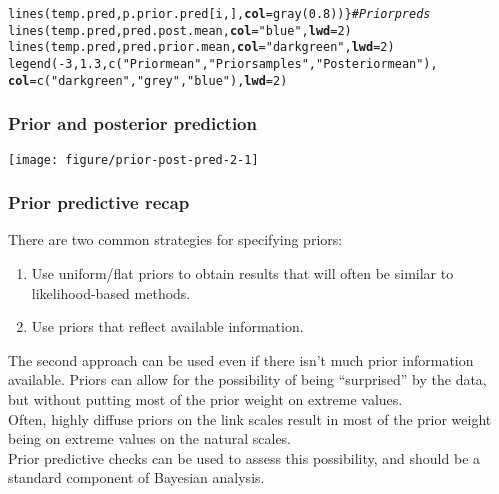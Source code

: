 \documentclass[color=usenames,dvipsnames]{beamer}\usepackage[]{graphicx}\usepackage[]{color}
\makeatletter
\newcommand{\hlnum}[1]{\textcolor[rgb]{0.69,0.494,0}{#1}}%
\newcommand{\hlstr}[1]{\textcolor[rgb]{0.749,0.012,0.012}{#1}}%
\newcommand{\hlcom}[1]{\textcolor[rgb]{0.514,0.506,0.514}{\textit{#1}}}%
\newcommand{\hlopt}[1]{\textcolor[rgb]{0,0,0}{#1}}%
\newcommand{\hlstd}[1]{\textcolor[rgb]{0,0,0}{#1}}%
\newcommand{\hlkwc}[1]{\textcolor[rgb]{0,0,0}{\textbf{#1}}}%
\newcommand{\hlkwd}[1]{\textcolor[rgb]{0.004,0.004,0.506}{#1}}%
\newenvironment{kframe}{%
 \def\at@end@of@kframe{}%
 \ifinner\ifhmode%
  \def\at@end@of@kframe{\end{minipage}}%
  \begin{minipage}{\columnwidth}%
 \fi\fi%
 \def\FrameCommand##1{\hskip\@totalleftmargin \hskip-\fboxsep
 \colorbox{shadecolor}{##1}\hskip-\fboxsep
     \hskip-\linewidth \hskip-\@totalleftmargin \hskip\columnwidth}%
 \MakeFramed {\advance\hsize-\width
   \@totalleftmargin\z@ \linewidth\hsize
   \@setminipage}}%
 {\par\unskip\endMakeFramed%
 \at@end@of@kframe}
\newenvironment{knitrout}{}{} %
\makeatother
\begin{document}
\begin{frame}[fragile]
\begin{knitrout}
\begin{kframe}
\begin{alltt}
    \hlkwd{lines}\hlstd{(temp.pred, p.prior.pred[i,],} \hlkwc{col}\hlstd{=}\hlkwd{gray}\hlstd{(}\hlnum{0.8}\hlstd{))  \}} \hlcom{# Prior preds}
\hlkwd{lines}\hlstd{(temp.pred, pred.post.mean,} \hlkwc{col}\hlstd{=}\hlstr{"blue"}\hlstd{,} \hlkwc{lwd}\hlstd{=}\hlnum{2}\hlstd{)}
\hlkwd{lines}\hlstd{(temp.pred, pred.prior.mean,} \hlkwc{col}\hlstd{=}\hlstr{"darkgreen"}\hlstd{,} \hlkwc{lwd}\hlstd{=}\hlnum{2}\hlstd{)}
\hlkwd{legend}\hlstd{(}\hlopt{-}\hlnum{3}\hlstd{,} \hlnum{1.3}\hlstd{,} \hlkwd{c}\hlstd{(}\hlstr{"Prior mean"}\hlstd{,} \hlstr{"Prior samples"}\hlstd{,} \hlstr{"Posterior mean"}\hlstd{),}
       \hlkwc{col}\hlstd{=}\hlkwd{c}\hlstd{(}\hlstr{"darkgreen"}\hlstd{,} \hlstr{"grey"}\hlstd{,} \hlstr{"blue"}\hlstd{),} \hlkwc{lwd}\hlstd{=}\hlnum{2}\hlstd{)}
\end{alltt}
\end{kframe}
\end{knitrout}
\end{frame}



\begin{frame}
  \frametitle{Prior and posterior prediction}
  \vspace{-3pt}
  \centering
  \texttt{[image: figure/prior-post-pred-2-1]}  \\
\end{frame}



\begin{frame}
  \frametitle{Prior predictive recap}
  There are two common strategies for specifying priors:
  \begin{enumerate}
    \item Use uniform/flat priors to obtain results that will often be
      similar to likelihood-based methods.
    \item Use priors that reflect available information.
  \end{enumerate}
  \pause
  \vfill
  The second approach can be used even if there isn't much prior
  information available. Priors can allow for the
  possibility of being ``surprised'' by the data, but without
  putting most of the prior weight on extreme values. \\
  \pause
  \vfill
  Often, highly diffuse priors on the link scales result in most of the
  prior weight being on extreme values on the natural scales. \\
  \pause
  \vfill
  Prior predictive checks can be used to assess this possibility, and
  should be a standard component of Bayesian analysis. \\
\end{frame}
\end{document}
